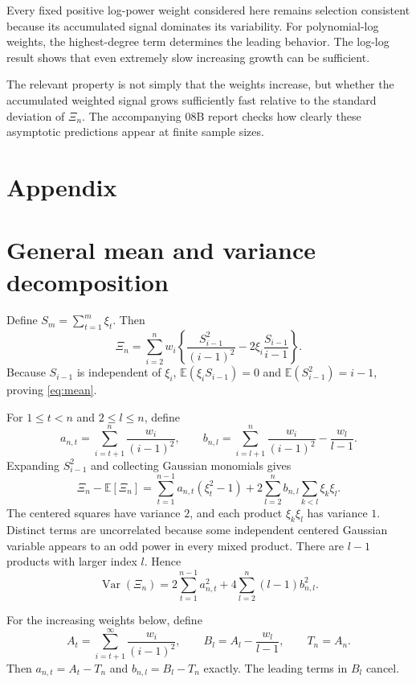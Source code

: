 \documentclass[11pt]{article}
\begin{document}
Every fixed positive log-power weight considered here remains selection
consistent because its accumulated signal dominates its variability.  For
polynomial-log weights, the highest-degree term determines the leading
behavior.  The log-log result shows that even extremely slow increasing
growth can be sufficient.

The relevant property is not simply that the weights increase, but whether
the accumulated weighted signal grows sufficiently fast relative to the
standard deviation of $\Xi_n$.  The accompanying 08B report checks how
clearly these asymptotic predictions appear at finite sample sizes.

\clearpage
\appendix
\section*{Appendix}

\section{General mean and variance decomposition}

Define $S_m=\sum_{t=1}^m\xi_t$.  Then
\begin{equation}
\Xi_n=\sum_{i=2}^n w_i\left\{
\frac{S_{i-1}^2}{(i-1)^2}-2\xi_i\frac{S_{i-1}}{i-1}\right\}.
\label{eq:expanded}
\end{equation}
Because $S_{i-1}$ is independent of $\xi_i$,
$\mathbb E(\xi_iS_{i-1})=0$ and $\mathbb E(S_{i-1}^2)=i-1$, proving
\eqref{eq:mean}.

For $1\leq t<n$ and $2\leq l\leq n$, define
\[
a_{n,t}=\sum_{i=t+1}^n\frac{w_i}{(i-1)^2},\qquad
b_{n,l}=\sum_{i=l+1}^n\frac{w_i}{(i-1)^2}-\frac{w_l}{l-1}.
\]
Expanding $S_{i-1}^2$ and collecting Gaussian monomials gives
\begin{equation}
\Xi_n-\mathbb E[\Xi_n]
=\sum_{t=1}^{n-1}a_{n,t}(\xi_t^2-1)
+2\sum_{l=2}^n b_{n,l}\sum_{k<l}\xi_k\xi_l.
\label{eq:decomp}
\end{equation}
The centered squares have variance $2$, and each product $\xi_k\xi_l$ has
variance $1$.  Distinct terms are uncorrelated because some independent
centered Gaussian variable appears to an odd power in every mixed product.
There are $l-1$ products with larger index $l$.  Hence
\begin{equation}
\operatorname{Var}(\Xi_n)=2\sum_{t=1}^{n-1}a_{n,t}^2
+4\sum_{l=2}^n(l-1)b_{n,l}^2.
\label{eq:variance}
\end{equation}

For the increasing weights below, define
\[
A_t=\sum_{i=t+1}^\infty\frac{w_i}{(i-1)^2},\qquad
B_l=A_l-\frac{w_l}{l-1},\qquad T_n=A_n.
\]
Then $a_{n,t}=A_t-T_n$ and $b_{n,l}=B_l-T_n$ exactly.  The leading terms
in $B_l$ cancel.
\end{document}
